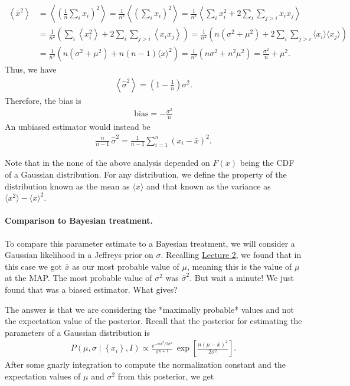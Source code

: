 \begin{align}
\left\langle\bar{x}^2\right\rangle
&= \left\langle\left(\frac{1}{n}\sum_ix_i\right)^2\right\rangle
= \frac{1}{n^2}\left\langle\left(\sum_ix_i\right)^2 \right\rangle
= \frac{1}{n^2}\left\langle\sum_i x_i^2 + 2\sum_i\sum_{j>i}x_i x_j\right\rangle \nonumber \\
&= \frac{1}{n^2}\left(\sum_i \left\langle x_i^2\right\rangle
+ 2\sum_i\sum_{j>i}\left\langle x_i x_j\right\rangle \right)
= \frac{1}{n^2}\left(n(\sigma^2 + \mu^2)
+ 2\sum_i\sum_{j>i}\langle x_i\rangle \langle x_j\rangle\right) \nonumber \\
&=\frac{1}{n^2}\left(n(\sigma^2 + \mu^2) + n(n-1)\langle x\rangle^2\right)
= \frac{1}{n^2}\left(n\sigma^2 + n^2\mu^2\right)
= \frac{\sigma^2}{n} + \mu^2.
\end{align}
Thus, we have
\begin{align}
\left\langle \hat{\sigma}^2 \right\rangle = \left(1-\frac{1}{n}\right)\sigma^2.
\end{align}
Therefore, the bias is
\begin{align}
    \text{bias} = -\frac{\sigma^2}{n}
\end{align}
An unbiased estimator would instead be
\begin{align}
    \frac{n}{n-1}\,\hat{\sigma}^2 = \frac{1}{n-1}\sum_{i=1}^n (x_i - \bar{x})^2.
\end{align}

Note that in the none of the above analysis depended on $F(x)$ being the CDF of a Gaussian distribution. For any distribution, we define the property of the distribution known as the mean as $\langle x\rangle$ and that known as the variance as $\langle x^2 \rangle - \langle x \rangle ^2$.


\paragraph{Comparison to Bayesian treatment.}
To compare this parameter estimate to a Bayesian treatment, we will consider a Gaussian likelihood in a Jeffreys prior on $\sigma$.
Recalling \href{http://bebi103.caltech.edu/2016/lecture_notes/l02_parameter_estimation.pdf}{Lecture 2}, we found that in this case we got $\bar{x}$ as our most probable value of $\mu$, meaning this is the value of $\mu$ at the MAP.  The most probable value of $\sigma^2$ was $\hat{\sigma}^2$.  But wait a minute! We just found that was a biased estimator. What gives?

The answer is that we are considering the *maximally probable* values and not the expectation value of the posterior.  Recall that the posterior for estimating the parameters of a Gaussian distribution is
\begin{align}
P(\mu,\sigma\mid \left\{x_i\right\},I) \propto \frac{\mathrm{e}^{-n\hat{\sigma}^2/2\sigma^2}}{\sigma^{n+1}}\,\exp\left[\frac{n(\mu - \bar{x})^2}{2\sigma^2}\right].
\end{align}
After some gnarly integration to compute the normalization constant and the expectation values of $\mu$ and $\sigma^2$ from this posterior, we get

